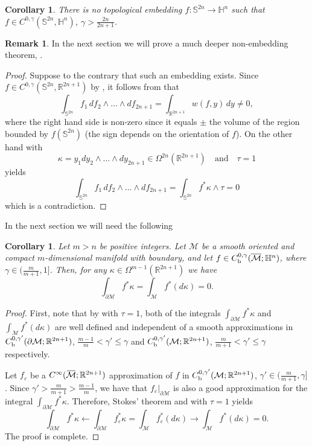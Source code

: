 \documentclass[intlimits,12pt,reqno]{amsart}
\newcommand{\cM}{\mathcal M}
\newcommand{\Sph}{\mathbb S}
\newcommand{\bbbh}{\mathbb H}
\newcommand{\R}{\mathbb R}
\newcommand{\overbar}[1]{\mkern 1.7mu\overline{\mkern-1.7mu#1\mkern-1.5mu}\mkern 1.5mu}
\newcommand{\eps}{\varepsilon}
\numberwithin{equation}{section}
\newtheorem{corollary}[theorem]{Corollary}
\theoremstyle{definition}
\newtheorem{remark}[theorem]{Remark}
\begin{document}
\begin{corollary}
\label{T56}
There is no topological embedding $f:\Sph^{2n}\to\bbbh^n$ such that
$f\in C^{0,\gamma}(\Sph^{2n},\bbbh^n)$, $\gamma>\frac{2n}{2n+1}$.
\end{corollary}
\begin{remark}
In the next section we will prove a much deeper non-embedding theorem, .
\end{remark}
\begin{proof}
Suppose to the contrary that such an embedding exists.
Since $f\in C^{0,\gamma}(\Sph^{2n},\R^{2n+1})$ by , it follows from  that
\begin{equation}
\label{eq34}
\int_{\Sph^{2n}} f_1\, df_2\wedge\ldots\wedge df_{2n+1}=
\int_{\R^{2n+1}}w(f,y)\, dy\neq 0,
\end{equation}
where the right hand side is non-zero since it equals $\pm$ the volume of the region bounded by $f(\Sph^{2n})$ (the sign depends on the orientation of $f$). On the other hand  with
$$
\kappa = y_1dy_2\wedge\ldots\wedge dy_{2n+1}\in \Omega^{2n}\left(\R^{2n+1}\right)
\quad
\text{and}
\quad
\tau= 1
$$
yields
$$
\int_{\Sph^{2n}}f_1\, df_2\wedge\ldots\wedge df_{2n+1}=
\int_{\Sph^{2n}} f^*\kappa\wedge\tau=0
$$
which is a contradiction.
\end{proof}

In the next section we will need the following 
\begin{corollary}
\label{T47b}
Let $m>n$ be positive integers. Let $\cM$ be a smooth oriented and compact $m$-dimensional manifold with boundary, and let
$f\in C_{\rm b}^{0,\gamma}(\overline{\cM};\bbbh^n)$, where $\gamma\in (\frac{m}{m+1},1]$.
Then, for any $\kappa\in \Omega^{m-1}(\R^{2n+1})$ we have
$$
\int_{\partial \cM} f^*\kappa = \int_{\cM}f^*(d\kappa)=0.
$$
\end{corollary}
\begin{proof}
First, note that by  with $\tau=1$, both of the integrals
$\int_{\partial\cM}f^*\kappa$ and $\int_{\cM}f^*(d\kappa)$ are well defined and independent of a smooth approximations in
$C_{\rm b}^{0,\gamma'}(\partial{\cM};\R^{2n+1})$, $\frac{m-1}{m}<\gamma'\leq\gamma$
and 
$C_{\rm b}^{0,\gamma'}(\cM;\R^{2n+1})$, $\frac{m}{m+1}<\gamma'\leq\gamma$ respectively.

Let $f_\eps$ be a $C^\infty(\overbar{\cM};\R^{2n+1})$ approximation of $f$ in $C_{\rm b}^{0,\gamma'}(\cM;\R^{2n+1})$, $\gamma'\in(\frac{m}{m+1},\gamma]$. Since $\gamma'>\frac{m}{m+1}>\frac{m-1}{m}$, we have that $f_\eps|_{\partial\cM}$ is also a good approximation for the integral $\int_{\partial\cM}f^*\kappa$.
Therefore, Stokes' theorem and  with $\tau=1$ yields
$$
\int_{\partial \cM} f^*\kappa\leftarrow \int_{\partial \cM} f_\eps^*\kappa = \int_{\cM} f_\eps^*(d\kappa)\rightarrow \int_{\cM} f^*(d\kappa)=0.
$$
The proof is complete.
\end{proof}
\end{document}
